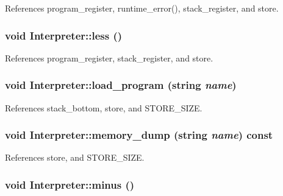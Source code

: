 References program\_\-register, runtime\_\-error(), stack\_\-register, and store.

\hypertarget{classInterpreter_a58ba8620d123934102e6c35fff1392f0}{
\subsubsection[{less}]{\setlength{\rightskip}{0pt plus 5cm}void Interpreter::less ()}}
\label{classInterpreter_a58ba8620d123934102e6c35fff1392f0}


References program\_\-register, stack\_\-register, and store.

\hypertarget{classInterpreter_ad88b100c53bbf05172daafcfaabf77a6}{
\subsubsection[{load\_\-program}]{\setlength{\rightskip}{0pt plus 5cm}void Interpreter::load\_\-program (string {\em name})}}
\label{classInterpreter_ad88b100c53bbf05172daafcfaabf77a6}


References stack\_\-bottom, store, and STORE\_\-SIZE.

\hypertarget{classInterpreter_aadc741cd76c43b3dda9d6c0841ba6548}{
\subsubsection[{memory\_\-dump}]{\setlength{\rightskip}{0pt plus 5cm}void Interpreter::memory\_\-dump (string {\em name}) const}}
\label{classInterpreter_aadc741cd76c43b3dda9d6c0841ba6548}


References store, and STORE\_\-SIZE.

\hypertarget{classInterpreter_ab5d74f8dc5770eb8f6869f30401e4a69}{
\subsubsection[{minus}]{\setlength{\rightskip}{0pt plus 5cm}void Interpreter::minus ()}}
\label{classInterpreter_ab5d74f8dc5770eb8f6869f30401e4a69}


